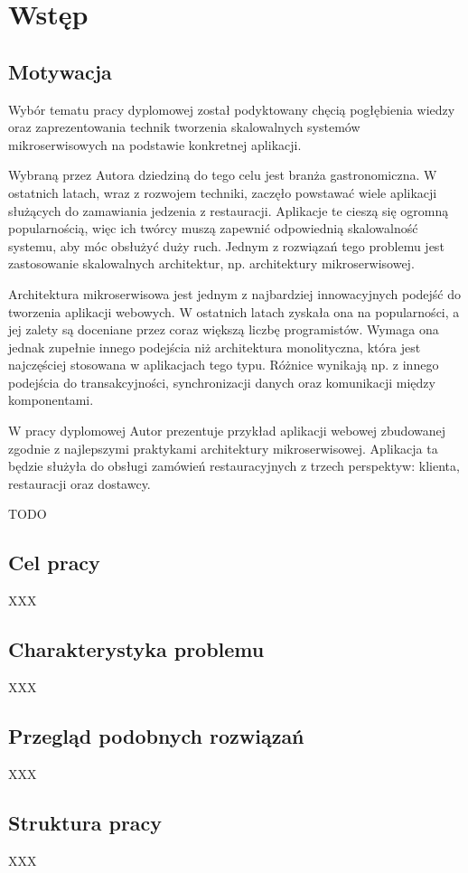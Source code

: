 \clearpage %
\section{Wstęp}

\subsection{Motywacja}

Wybór tematu pracy dyplomowej został podyktowany chęcią pogłębienia wiedzy oraz zaprezentowania technik tworzenia skalowalnych systemów mikroserwisowych na podstawie konkretnej aplikacji.

Wybraną przez Autora dziedziną do tego celu jest branża gastronomiczna. W ostatnich latach, wraz z rozwojem techniki, zaczęło powstawać wiele aplikacji służących do zamawiania jedzenia z restauracji. Aplikacje te cieszą się ogromną popularnością, więc ich twórcy muszą zapewnić odpowiednią skalowalność systemu, aby móc obsłużyć duży ruch. Jednym z rozwiązań tego problemu jest zastosowanie skalowalnych architektur, np. architektury mikroserwisowej.

Architektura mikroserwisowa jest jednym z najbardziej innowacyjnych podejść do tworzenia aplikacji webowych. W ostatnich latach zyskała ona na popularności, a jej zalety są doceniane przez coraz większą liczbę programistów. Wymaga ona jednak zupełnie innego podejścia niż architektura monolityczna, która jest najczęściej stosowana w aplikacjach tego typu. Różnice wynikają np. z innego podejścia do transakcyjności, synchronizacji danych oraz komunikacji między komponentami.

W pracy dyplomowej Autor prezentuje przykład aplikacji webowej zbudowanej zgodnie z najlepszymi praktykami architektury mikroserwisowej. Aplikacja ta będzie służyła do obsługi zamówień restauracyjnych z trzech perspektyw: klienta, restauracji oraz dostawcy.

TODO

\subsection{Cel pracy}

XXX

\subsection{Charakterystyka problemu}

XXX

\subsection{Przegląd podobnych rozwiązań}

XXX

\subsection{Struktura pracy}

XXX

